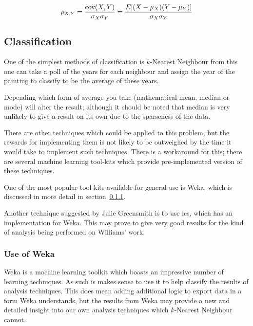 \begin{equation}\label{eq:pearsons}
\rho_{X,Y}={\mathrm{cov}(X,Y) \over \sigma_X \sigma_Y} ={E[(X-\mu_X)(Y-\mu_Y)] \over \sigma_X\sigma_Y}
\end{equation}


\subsection{Classification}
One of the simplest methods of classification is $k$-Nearest Neighbour from
this one can take a poll of the years for each neighbour and assign the year of the painting to
classify to be the average of these years.

Depending which form of average you take (mathematical mean, median or mode) will
alter the result; although it should be noted that median is very unlikely to give a result on its
own due to the sparseness of the data.

There are other techniques which could be applied to this problem, but the rewards for 
implementing them is not likely to be outweighed by the time it would take to implement such
techniques. There is a workaround for this; there are several machine learning tool-kits which 
provide pre-implemented version of these techniques.

One of the most popular tool-kits available for general use is Weka\cite{Hall2009WEKA}, which is discussed in more
detail in section~\ref{sec:bg-weka}.

Another technique suggested by Julie Greensmith is to use \gls{lcs}\cite{Bacardit2013Largescale}, 
which has an implementation for Weka. This may prove to give very good results for the kind of
analysis being performed on Williams' work.

\subsubsection{Use of Weka}\label{sec:bg-weka}
Weka is a machine learning toolkit which boasts an impressive number of learning techniques. As
such is makes sense to use it to help classify the results of analysis techniques. This does mean
adding additional logic to export data in a form Weka understands, but the results from Weka
may provide a new and detailed insight into our own analysis techniques which $k$-Nearest 
Neighbour cannot.


